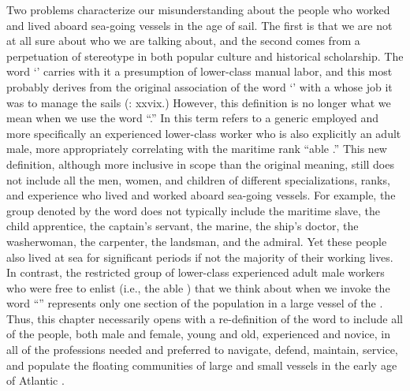   Two problems characterize our misunderstanding about the people who worked and lived aboard sea-going vessels in the age of sail. The first is that we are not at all sure about who we are talking about, and the second comes from a perpetuation of stereotype in both popular culture and historical scholarship. The word ‘’ carries with it a presumption of lower-class manual labor, and this most probably derives from the original association of the word ‘’ with a  whose job it was to manage the sails (\citealt{AdkinsAdkins2008}: xxvix.) However, this definition is no longer what we mean when we use the word “.” In  this term refers to a generic employed  and more specifically an experienced lower-class worker who is also explicitly an adult male, more appropriately correlating with the maritime rank “able .” This new definition, although more inclusive in scope than the original meaning, still does not include all the men, women, and children of different specializations, ranks, and experience who lived and worked aboard sea-going vessels. For example, the group denoted by the word does not typically include the maritime slave, the child apprentice, the captain’s servant, the marine, the ship’s doctor, the washerwoman, the carpenter, the landsman, and the admiral. Yet these people also lived at sea for significant periods if not the majority of their working lives. In contrast, the restricted group of lower-class experienced adult male workers who were free to enlist (i.e., the able ) that we think about when we invoke the word “” represents only one section of the population in a large vessel of the . Thus, this chapter necessarily opens with a re-definition of the word to include all of the people, both male and female, young and old, experienced and novice, in all of the professions needed and preferred to navigate, defend, maintain, service, and populate the floating communities of large and small vessels in the early age of Atlantic . 


